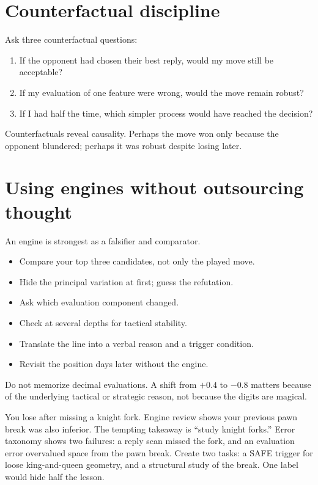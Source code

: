 \section{Counterfactual discipline}
Ask three counterfactual questions:

\begin{enumerate}[label=\textbf{\arabic*.},leftmargin=2em]
\item If the opponent had chosen their best reply, would my move still be acceptable?
\item If my evaluation of one feature were wrong, would the move remain robust?
\item If I had half the time, which simpler process would have reached the decision?
\end{enumerate}

Counterfactuals reveal causality. Perhaps the move won only because the opponent blundered; perhaps it was robust despite losing later.

\section{Using engines without outsourcing thought}
An engine is strongest as a falsifier and comparator.

\begin{itemize}[leftmargin=1.4em]
\item Compare your top three candidates, not only the played move.
\item Hide the principal variation at first; guess the refutation.
\item Ask which evaluation component changed.
\item Check at several depths for tactical stability.
\item Translate the line into a verbal reason and a trigger condition.
\item Revisit the position days later without the engine.
\end{itemize}

Do not memorize decimal evaluations. A shift from $+0.4$ to $-0.8$ matters because of the underlying tactical or strategic reason, not because the digits are magical.

\begin{workedbox}[title={Worked example: the wrong lesson from a blunder}]
You lose after missing a knight fork. Engine review shows your previous pawn break was also inferior. The tempting takeaway is ``study knight forks.'' Error taxonomy shows two failures: a reply scan missed the fork, and an evaluation error overvalued space from the pawn break. Create two tasks: a SAFE trigger for loose king-and-queen geometry, and a structural study of the break. One label would hide half the lesson.
\end{workedbox}

